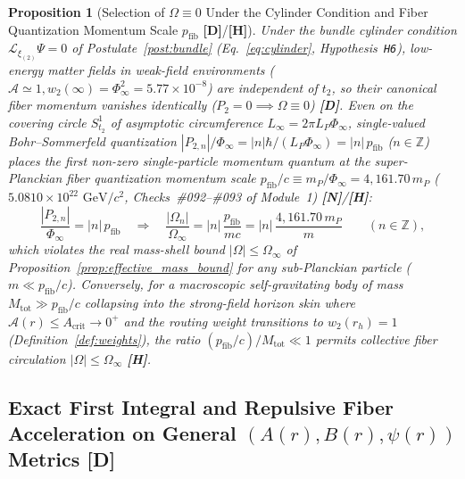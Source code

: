 \documentclass[11pt,a4paper]{article}
\newcommand{\catD}{\textbf{\textcolor{blue!75!black}{[D]}}}
\newcommand{\catH}{\textbf{\textcolor{orange!85!black}{[H]}}}
\newcommand{\catN}{\textbf{\textcolor{teal!75!black}{[N]}}}
\newtheorem{proposition}[theorem]{Proposition}
\theoremstyle{definition}
\theoremstyle{remark}
\begin{document}
\begin{proposition}[Selection of $\Omega \equiv 0$ Under the Cylinder Condition and Fiber Quantization Momentum Scale $p_{\text{fib}}$ \catD/\catH]
\label{prop:macroscopic_activation}
\label{thm:omega_zero_superselection}
Under the bundle cylinder condition $\mathcal{L}_{\xi_{(2)}}\Psi = 0$ of Postulate~\ref{post:bundle} (Eq.~\ref{eq:cylinder}, Hypothesis~\texttt{H6}), low-energy matter fields in weak-field environments ($\mathcal{A} \simeq 1, w_2(\infty) = \Phi_{\infty}^2 = 5.77 \times 10^{-8}$) are independent of $t_2$, so their canonical fiber momentum vanishes identically ($P_2 = 0 \implies \Omega \equiv 0$) \catD. Even on the covering circle $S^1_{t_2}$ of asymptotic circumference $L_{\infty} = 2\pi L_P\Phi_{\infty}$, single-valued Bohr--Sommerfeld quantization $|P_{2,n}|/\Phi_{\infty} = |n|\hbar/(L_P\Phi_{\infty}) = |n|\,p_{\text{fib}}$ ($n \in \mathbb{Z}$) places the first non-zero single-particle momentum quantum at the super-Planckian fiber quantization momentum scale $p_{\text{fib}}/c \equiv m_P/\Phi_{\infty} = 4{,}161.70\,m_P$ ($5.0810 \times 10^{22}\text{ GeV}/c^2$, Checks~\#092--\#093 of Module~1) \catN/\catH:
\begin{equation}
  \frac{|P_{2,n}|}{\Phi_{\infty}} = |n|\,p_{\text{fib}} \quad \Longrightarrow \quad \frac{|\Omega_n|}{\Omega_{\infty}} = |n|\,\frac{p_{\text{fib}}}{m c} = |n|\,\frac{4{,}161.70\,m_P}{m} \qquad (n \in \mathbb{Z}),
  \label{eq:exact_omega_quantization}
\end{equation}
which violates the real mass-shell bound $|\Omega| \le \Omega_{\infty}$ of Proposition~\ref{prop:effective_mass_bound} for any sub-Planckian particle ($m \ll p_{\text{fib}}/c$). Conversely, for a macroscopic self-gravitating body of mass $M_{\text{tot}} \gg p_{\text{fib}}/c$ collapsing into the strong-field horizon skin where $\mathcal{A}(r) \le A_{\text{crit}} \to 0^+$ and the routing weight transitions to $w_2(r_h) = 1$ (Definition~\ref{def:weights}), the ratio $(p_{\text{fib}}/c)/M_{\text{tot}} \ll 1$ permits collective fiber circulation $|\Omega| \le \Omega_{\infty}$ \catH.
\end{proposition}

\subsection{\texorpdfstring{Exact First Integral and Repulsive Fiber Acceleration on General $(A(r), B(r), \psi(r))$ Metrics \catD}{Exact First Integral and Repulsive Fiber Acceleration on General (A(r), B(r), psi(r)) Metrics}}
\end{document}
